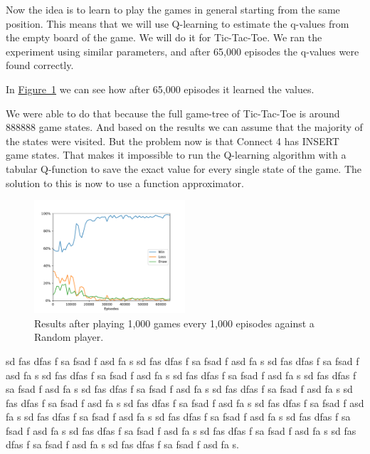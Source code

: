 \documentclass{article}
\begin{document}
Now the idea is to learn to play the games in general starting from the same position. This means
that we will use Q-learning to estimate the q-values from the empty board of the game. We will do it
for Tic-Tac-Toe. We ran the experiment using similar parameters, and after 65,000 episodes the
q-values were found correctly.


In \hyperref[fig:tic-ql-tab-full-wld-plot]{Figure~\ref*{fig:tic-ql-tab-full-wld-plot}} we can see
how after 65,000 episodes it learned the values.

We were able to do that because the full game-tree of Tic-Tac-Toe is around 888888 game states. And
based on the results we can assume that the majority of the states were visited. But the problem now
is that Connect 4 has INSERT game states. That makes it impossible to run the Q-learning algorithm
with a tabular Q-function to save the exact value for every single state of the game. The solution
to this is now to use a function approximator.

\begin{figure}[!h]
    \centering
    \includegraphics[width=0.50\textwidth]{figures/tic_ql_tab_full_wld_plot.pdf}
    \caption{Results after playing 1,000 games every 1,000 episodes against a Random player.}
    \label{fig:tic-ql-tab-full-wld-plot}
\end{figure}

sd fas dfas f sa fsad f asd fa s sd fas dfas f sa fsad f asd fa s sd fas dfas f sa fsad f asd fa s
sd fas dfas f sa fsad f asd fa s sd fas dfas f sa fsad f asd fa s sd fas dfas f sa fsad f asd fa s
sd fas dfas f sa fsad f asd fa s sd fas dfas f sa fsad f asd fa s sd fas dfas f sa fsad f asd fa s
sd fas dfas f sa fsad f asd fa s sd fas dfas f sa fsad f asd fa s sd fas dfas f sa fsad f asd fa s
sd fas dfas f sa fsad f asd fa s sd fas dfas f sa fsad f asd fa s sd fas dfas f sa fsad f asd fa s
sd fas dfas f sa fsad f asd fa s sd fas dfas f sa fsad f asd fa s sd fas dfas f sa fsad f asd fa s.
\end{document}
